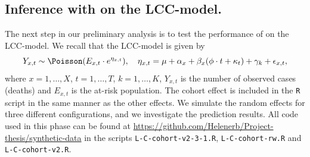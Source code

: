 \subsection{Inference with \inlabru on the LCC-model. }
The next step in our preliminary analysis is to test the performance of \inlabru on the LCC-model. We recall that the LCC-model is given by
\begin{equation}
    Y_{x,t} \sim \Poisson(E_{x,t}\cdot e^{\eta_{x,t}}), \quad \eta_{x,t} = \mu + \alpha_x + \beta_x(\phi \cdot t + \kappa_t) + \gamma_k + \epsilon_{x,t},
    \label{eq:LCC-rewritten-rep1}
\end{equation}
where $x = 1,\ldots,X$, $t = 1,\ldots,T$, $k = 1,\ldots,K$, $Y_{x,t}$ is the number of observed cases (deaths) and $E_{x,t}$ is the at-risk population. The cohort effect is included in the \texttt{R} script in the same manner as the other effects. We simulate the random effects for three different configurations, and we investigate the prediction results. All code used in this phase can be found at \url{https://github.com/Helenerb/Project-thesis/synthetic-data} in the scripts \texttt{L-C-cohort-v2-3-1.R}, \texttt{L-C-cohort-rw.R} and \texttt{L-C-cohort-v2.R}.

